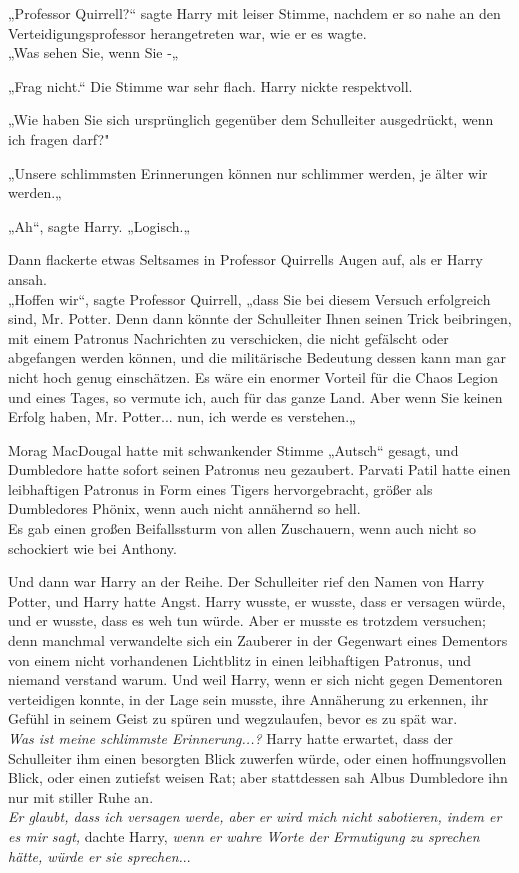 {„Professor Quirrell?“ sagte Harry mit leiser Stimme, nachdem er so nahe an den Verteidigungsprofessor herangetreten war, wie er es wagte.\\ „Was sehen Sie, wenn Sie -„

„Frag nicht.“ Die Stimme war sehr flach. Harry nickte respektvoll.

„Wie haben Sie sich ursprünglich gegenüber dem Schulleiter ausgedrückt, wenn ich fragen darf?"

„Unsere schlimmsten Erinnerungen können nur schlimmer werden, je älter wir werden.„

„Ah“, sagte Harry. „Logisch.„

Dann flackerte etwas Seltsames in Professor Quirrells Augen auf, als er Harry ansah.\\ „Hoffen wir“, sagte Professor Quirrell, „dass Sie bei diesem Versuch erfolgreich sind, Mr. Potter. Denn dann könnte der Schulleiter Ihnen seinen Trick beibringen, mit einem Patronus Nachrichten zu verschicken, die nicht gefälscht oder abgefangen werden können, und die militärische Bedeutung dessen kann man gar nicht hoch genug einschätzen. Es wäre ein enormer Vorteil für die Chaos Legion und eines Tages, so vermute ich, auch für das ganze Land. Aber wenn Sie keinen Erfolg haben, Mr. Potter... nun, ich werde es verstehen.„

Morag MacDougal hatte mit schwankender Stimme „Autsch“ gesagt, und Dumbledore hatte sofort seinen Patronus neu gezaubert. Parvati Patil hatte einen leibhaftigen Patronus in Form eines Tigers hervorgebracht, größer als Dumbledores Phönix, wenn auch nicht annähernd so hell.\\ Es gab einen großen Beifallssturm von allen Zuschauern, wenn auch nicht so schockiert wie bei Anthony.

Und dann war Harry an der Reihe. Der Schulleiter rief den Namen von Harry Potter, und Harry hatte Angst. Harry wusste, er wusste, dass er versagen würde, und er wusste, dass es weh tun würde. Aber er musste es trotzdem versuchen; denn manchmal verwandelte sich ein Zauberer in der Gegenwart eines Dementors von einem nicht vorhandenen Lichtblitz in einen leibhaftigen Patronus, und niemand verstand warum. Und weil Harry, wenn er sich nicht gegen Dementoren verteidigen konnte, in der Lage sein musste, ihre Annäherung zu erkennen, ihr Gefühl in seinem Geist zu spüren und wegzulaufen, bevor es zu spät war.\\ \emph{\hfill\break Was ist meine schlimmste Erinnerung...?} Harry hatte erwartet, dass der Schulleiter ihm einen besorgten Blick zuwerfen würde, oder einen hoffnungsvollen Blick, oder einen zutiefst weisen Rat; aber stattdessen sah Albus Dumbledore ihn nur mit stiller Ruhe an.\\ \emph{Er glaubt, dass ich versagen werde, aber er wird mich nicht sabotieren, indem er es mir sagt,} dachte Harry, \emph{wenn er wahre Worte der Ermutigung zu sprechen hätte, würde er sie sprechen.}..

}
